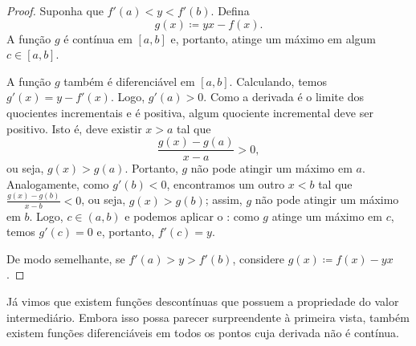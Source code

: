 \begin{proof}
Suponha que $f'(a) < y < f'(b)$. Defina
\begin{equation*}
g(x) \coloneqq yx - f(x) .
\end{equation*}
A função $g$ é contínua em $[a,b]$ e, portanto, atinge um máximo em algum $c \in [a,b]$.

A função $g$ também é diferenciável em $[a,b]$. Calculando, temos $g'(x) = y-f'(x)$. Logo, $g'(a) > 0$. Como a derivada é o limite dos quocientes incrementais e é positiva, algum quociente incremental deve ser positivo. Isto é, deve existir $x > a$ tal que
\begin{equation*}
\frac{g(x)-g(a)}{x-a} > 0 ,
\end{equation*}
ou seja, $g(x) > g(a)$. Portanto, $g$ não pode atingir um máximo em $a$. Analogamente, como $g'(b) < 0$, encontramos um outro $x < b$ tal que $\frac{g(x)-g(b)}{x-b} < 0$, ou seja, $g(x) > g(b)$; assim, $g$ não pode atingir um máximo em $b$. Logo, $c \in (a,b)$ e podemos aplicar o : como $g$ atinge um máximo em $c$, temos $g'(c)=0$ e, portanto, $f'(c)=y$.

De modo semelhante, se $f'(a) > y > f'(b)$, considere $g(x) \coloneqq f(x)- yx$.
\end{proof}

Já vimos que existem funções descontínuas que possuem a propriedade do valor intermediário. Embora isso possa parecer surpreendente à primeira vista, também existem funções diferenciáveis em todos os pontos cuja derivada não é contínua.

